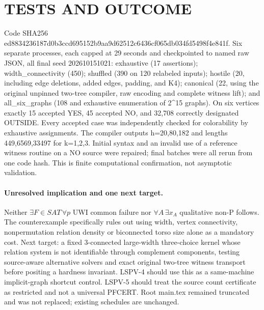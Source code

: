 \documentclass[11pt]{article}
\begin{document}
\section{TESTS AND OUTCOME}
Code SHA256 ed8834236187d0b3ccd695152b9aa9d62512c6436cf065db034fd5498f4e841f. Six separate processes, each capped at 29 seconds and checkpointed to named raw JSON, all final seed 202610151021: exhaustive (17 assertions); width_connectivity (450); shuffled (390 on 120 relabeled inputs); hostile (20, including edge deletions, added edges, padding, and K4); canonical (22, using the original unpinned two-tree compiler, raw encoding and complete witness lift); and all_six_graphs (108 and exhaustive enumeration of 2^15 graphs). On six vertices exactly 15 accepted YES, 45 accepted NO, and 32,708 correctly designated OUTSIDE. Every accepted case was independently checked for colorability by exhaustive assignments. The compiler outputs h=20,80,182 and lengths 449,6569,33497 for k=1,2,3. Initial syntax and an invalid use of a reference witness routine on a NO source were repaired; final batches were all rerun from one code hash. This is finite computational confirmation, not asymptotic validation.

\paragraph{Unresolved implication and one next target.}
Neither $\exists F\in SAT\,\forall p$ UWI common failure nor $\forall A\,\exists x_A$ qualitative non-P follows. The counterexample specifically rules out using width, vertex connectivity, nonpermutation relation density or biconnected torso size alone as a mandatory cost. Next target: a fixed 3-connected large-width three-choice kernel whose relation system is not identifiable through complement components, testing source-aware alternative solvers and exact original two-tree witness transport before positing a hardness invariant. LSPV-4 should use this as a same-machine implicit-graph shortcut control. LSPV-5 should treat the source count certificate as restricted and not a universal PFCERT. Root main.tex remained truncated and was not replaced; existing schedules are unchanged.
\end{document}
